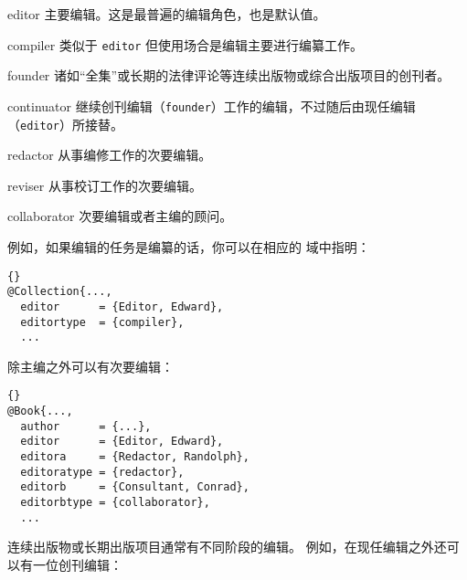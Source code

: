\begin{marglist}
	\setlength{\itemsep}{0pt}
	\item[editor] %
	主要编辑。这是最普遍的编辑角色，也是默认值。
	\item[compiler] %
	类似于 \texttt{editor} 但使用场合是编辑主要进行编纂工作。
	\item[founder] %
	诸如“全集”或长期的法律评论等连续出版物或综合出版项目的创刊者。
	\item[continuator] %
	继续创刊编辑（\texttt{founder}）工作的编辑，不过随后由现任编辑（\texttt{editor}）所接替。
	\item[redactor] %
	从事编修工作的次要编辑。
	\item[reviser] %
	从事校订工作的次要编辑。
	\item[collaborator] %
	次要编辑或者主编的顾问。
\end{marglist}
%
例如，如果编辑的任务是编纂的话，你可以在相应的  域中指明：

\begin{lstlisting}[style=bibtex]{}
@Collection{...,
  editor      = {Editor, Edward},
  editortype  = {compiler},
  ...
\end{lstlisting}
%
除主编之外可以有次要编辑：

\begin{lstlisting}[style=bibtex]{}
@Book{...,
  author      = {...},
  editor      = {Editor, Edward},
  editora     = {Redactor, Randolph},
  editoratype = {redactor},
  editorb     = {Consultant, Conrad},
  editorbtype = {collaborator},
  ...
\end{lstlisting}
%
连续出版物或长期出版项目通常有不同阶段的编辑。
例如，在现任编辑之外还可以有一位创刊编辑：

